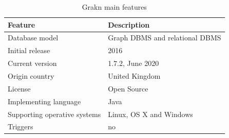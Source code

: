 \begin{table}[H]
\caption{Grakn main features}
\begin{adjustbox}{width=\columnwidth,center}
\begin{tabular}{|l|l|}
\hline
\textbf{Feature}             & \textbf{Description}                               \\ \hline
Database model                      & Graph DBMS  and relational DBMS                    \\ \hline
Initial release                     & 2016                                              \\ \hline
Current version                     &  1.7.2, June 2020                                 \\ \hline
Origin country                      & United Kingdom                                    \\ \hline
License                             & Open Source                                       \\ \hline
Implementing language               & Java                                              \\ \hline
Supporting operative systems        & Linux, OS X and Windows                           \\ \hline
Triggers                            & no                                                 \\ \hline

\end{tabular}
\end{adjustbox}
\end{table}
